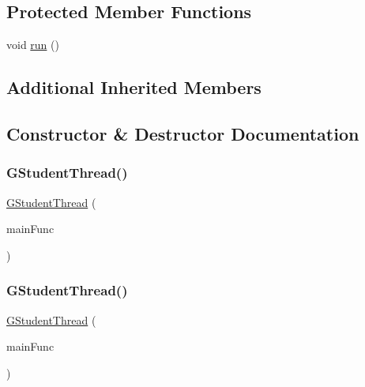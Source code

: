 \subsection*{Protected Member Functions}
\begin{DoxyCompactItemize}
\item 
void \mbox{\hyperlink{classGStudentThread_a13a43e6d814de94978c515cb084873b1}{run}} ()
\end{DoxyCompactItemize}
\subsection*{Additional Inherited Members}


\subsection{Constructor \& Destructor Documentation}
\mbox{\label{classGStudentThread_a125901bcd185be5775579e6c10bfc63d}} 
\subsubsection{\texorpdfstring{G\+Student\+Thread()}{GStudentThread()}\hspace{0.1cm}{\footnotesize\ttfamily [1/2]}}
{\footnotesize\ttfamily \mbox{\hyperlink{classGStudentThread}{G\+Student\+Thread}} (\begin{DoxyParamCaption}\item[{G\+Thunk}]{main\+Func }\end{DoxyParamCaption})}

\mbox{\label{classGStudentThread_a64da646ed16e65b114391682c16d0d0d}} 
\subsubsection{\texorpdfstring{G\+Student\+Thread()}{GStudentThread()}\hspace{0.1cm}{\footnotesize\ttfamily [2/2]}}
{\footnotesize\ttfamily \mbox{\hyperlink{classGStudentThread}{G\+Student\+Thread}} (\begin{DoxyParamCaption}\item[{G\+Thunk\+Int}]{main\+Func }\end{DoxyParamCaption})}



